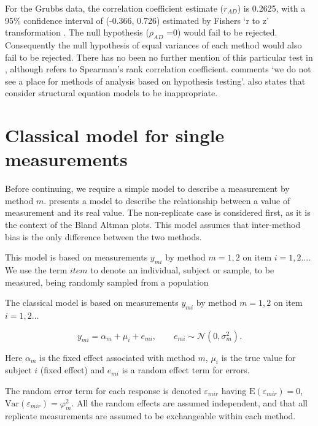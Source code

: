 \documentclass[12pt, a4paper]{report}
\theoremstyle{plain}
\theoremstyle{definition}
\theoremstyle{remark}
\begin{document}
For the Grubbs data, the correlation coefficient estimate
($r_{AD}$) is 0.2625, with a 95\% confidence interval of (-0.366,
0.726) estimated by Fishers `r to z' transformation \citep{Cohen}.
The null hypothesis ($\rho_{AD}$ =0) would fail to be rejected.
Consequently the null hypothesis of equal variances of each method
would also fail to be rejected.
There has
no been no further mention of this particular test in
\citet{BA86}, although \citet{BA99} refers to Spearman's rank
correlation coefficient. \citet{BA99} comments `we do not see a
place for methods of analysis based on hypothesis testing'.
\citet{BA99} also states that consider structural equation models
to be inappropriate.


	\section{Classical model for single measurements}
	
	
	Before continuing, we require a simple model to describe a measurement by method $m$. \citet{BXC2004} presents a model to describe the relationship between a value of measurement and its
	real value. The non-replicate case is considered first, as it is the context of the Bland Altman plots. This model assumes that inter-method bias is the only difference between the two methods.
	
	This model is based on measurements $y_{mi}$ by method $m=1,2$ on item $i = 1,2 \ldots$. We use the term $item$ to denote an individual, subject or sample, to be measured, being randomly sampled from a population
	
	
	The classical model is based on measurements $y_{mi}$ by method $m=1,2$ on item $i = 1,2 \ldots$
	
		\begin{equation}
		y_{mi}  = \alpha_{m} + \mu_{i} + e_{mi}, \qquad  e_{mi} \sim
		\mathcal{N}(0,\sigma^{2}_{m}).
		\end{equation}
	
	
	Here $\alpha_m$ is the fixed effect associated with method $m$,
	$\mu_i$ is the true value for subject $i$ (fixed effect) and $e_{mi}$ is a random effect term for errors.
	
	The random error term for each response is denoted $\varepsilon_{mir}$ having $\mathrm{E}(\varepsilon_{mir})=0$, $\mathrm{Var}(\varepsilon_{mir})=\varphi^2_m$. All the random effects are assumed independent, and that all replicate measurements are assumed to be exchangeable within each method.
	
\end{document}
